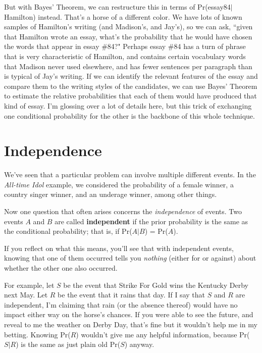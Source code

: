 But with Bayes' Theorem, we can restructure this in terms of
Pr(essay84$|$Hamilton) instead. That's a horse of a different color. We
have lots of known samples of Hamilton's writing (and Madison's, and
Jay's), so we can ask, ``given that Hamilton wrote an essay, what's the
probability that he would have chosen the words that appear in essay \#84?"
Perhaps essay \#84 has a turn of phrase that is very characteristic of
Hamilton, and contains certain vocabulary words that Madison never used
elsewhere, and has fewer sentences per paragraph than is typical of Jay's
writing. If we can identify the relevant features of the essay and compare
them to the writing styles of the candidates, we can use Bayes' Theorem to
estimate the relative probabilities that each of them would have produced
that kind of essay. I'm glossing over a lot of details here, but this trick
of exchanging one conditional probability for the other is the backbone of
this whole technique.


\section{Independence}

We've seen that a particular problem can involve multiple different events.
In the \textit{All-time Idol} example, we considered the probability of a
female winner, a country singer winner, and an underage winner, among other
things.

Now one question that often arises concerns the \textit{independence} of
events. Two events $A$ and $B$ are called \textbf{independent} if the prior
probability is the same as the conditional probability; that is, if
Pr($A|B$) = Pr($A$).

If you reflect on what this means, you'll see that with independent events,
knowing that one of them occurred tells you \textit{nothing} (either for or
against) about whether the other one also occurred.

For example, let $S$ be the event that Strike For Gold wins the Kentucky
Derby next May.  Let $R$ be the event that it rains that day. If I say that
$S$ and $R$ are independent, I'm claiming that rain (or the absence
thereof) would have no impact either way on the horse's chances. If you
were able to see the future, and reveal to me the weather on Derby Day,
that's fine but it wouldn't help me in my betting. Knowing Pr($R$) wouldn't
give me any helpful information, because Pr($S|R$) is the same as just
plain old Pr($S$) anyway.

